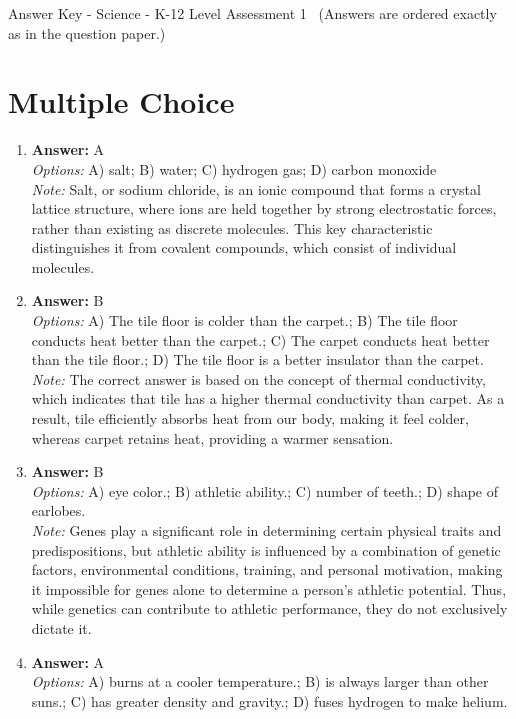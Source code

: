 \documentclass[12pt]{article}
\begin{document}
\begin{center}
Answer Key - Science - K-12 Level Assessment 1 \
\small (Answers are ordered exactly as in the question paper.)
\end{center}

\section*{Multiple Choice}
\begin{enumerate}[label=\arabic*.]
\item \textbf{Answer:} A
\\ \textit{Options:} A) salt; B) water; C) hydrogen gas; D) carbon monoxide
\\ \textit{Note:} Salt, or sodium chloride, is an ionic compound that forms a crystal lattice structure, where ions are held together by strong electrostatic forces, rather than existing as discrete molecules. This key characteristic distinguishes it from covalent compounds, which consist of individual molecules.
\item \textbf{Answer:} B
\\ \textit{Options:} A) The tile floor is colder than the carpet.; B) The tile floor conducts heat better than the carpet.; C) The carpet conducts heat better than the tile floor.; D) The tile floor is a better insulator than the carpet.
\\ \textit{Note:} The correct answer is based on the concept of thermal conductivity, which indicates that tile has a higher thermal conductivity than carpet. As a result, tile efficiently absorbs heat from our body, making it feel colder, whereas carpet retains heat, providing a warmer sensation.
\item \textbf{Answer:} B
\\ \textit{Options:} A) eye color.; B) athletic ability.; C) number of teeth.; D) shape of earlobes.
\\ \textit{Note:} Genes play a significant role in determining certain physical traits and predispositions, but athletic ability is influenced by a combination of genetic factors, environmental conditions, training, and personal motivation, making it impossible for genes alone to determine a person's athletic potential. Thus, while genetics can contribute to athletic performance, they do not exclusively dictate it.
\item \textbf{Answer:} A
\\ \textit{Options:} A) burns at a cooler temperature.; B) is always larger than other suns.; C) has greater density and gravity.; D) fuses hydrogen to make helium.

\end{enumerate}
\end{document}
